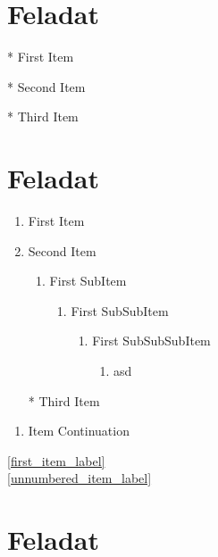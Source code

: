 \documentclass{article}
\begin{document}
	\section{Feladat}
		\begin{itemize*}[itemjoin*={\hspace{1em}and }]
			\item[*] First Item
			\item[*] Second Item
			\item[*] Third Item
		\end{itemize*}
	
	\listoffigures
	\listoftables
	
	\section{Feladat}
		\begin{enumerate}
			\item First Item
				\label{first_item_label}
			\item Second Item
				\begin{enumerate}[label=\Roman*]
					\item First SubItem
						\begin{enumerate}
							\item First SubSubItem
								\begin{enumerate}
									\item First SubSubSubItem
										\begin{enumerate}
											\item asd
										\end{enumerate}
								\end{enumerate}
						\end{enumerate}
				\end{enumerate}
			\item[*] Third Item
				\label{unnumbered_item_label}
		\end{enumerate}
		
		\lipsum[3]
		
		\begin{enumerate}[resume]
			\item Item Continuation
		\end{enumerate}
		\ref{first_item_label}\\
		\ref{unnumbered_item_label}
		
	\section{Feladat}
		\begin{description}[style=nextline]
			\item[]\lipsum[1]
			\item[Description List]\lipsum[1]
			\item[wwwwwwwwwwwwwwwwwwwwwwwwwwwwwwwwwwwwwwwwwwwwwwwwwwwwwwwwwwwwwww] \lipsum[1]
		\end{description}
	
\end{document}
